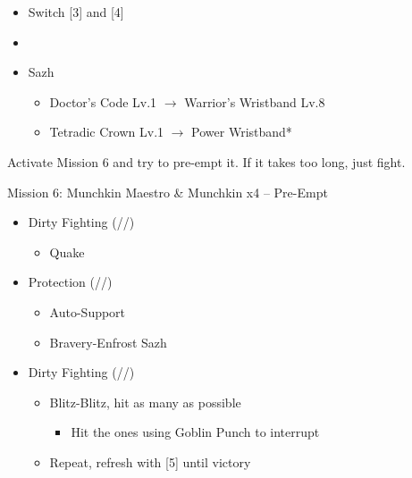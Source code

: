 \begin{menu}
	\begin{itemize}
		\paradigm
		\begin{itemize}
			\item Switch [3] and [4]
			\item {}%
				  {\paradigmline{(\syn)}{(\med)}{\sen}}%
			      {\paradigmline{\rav}{(\sab)}{\rav}}%
			      {\paradigmline{\syn}{\med}{\com}}%
			      {\paradigmline{(\syn)}{\sab}{\rav}}%
			      {\paradigmline{\com}{(\sab)}{\com}}%
			      {\paradigmline[4]{\com}{\sab}{\sen}}
		\end{itemize}
		\equip
		\begin{itemize}
			\item Sazh
				\begin{itemize}
					\item Doctor's Code Lv.1 $\rightarrow$ Warrior's Wristband Lv.8
					\item Tetradic Crown Lv.1 $\rightarrow$ Power Wristband*
				\end{itemize}
		\end{itemize}
	\end{itemize}
\end{menu}

\renewcommand{\first}{[1] Protection (\syn/\med/\sen)}
\renewcommand{\second}{[2] Smart Bomb (\rav/\sab/\rav}
\renewcommand{\third}{[3] Hero's Charge (\syn/\med/\com)}
\renewcommand{\fourth}{[4] Guerilla (\syn/\sab/\rav)}
\renewcommand{\fifth}{[5] Devastation (\com/\sab/\com)}
\renewcommand{\sixth}{[6] Dirty Fighting (\com/\sab/\sen)}

Activate Mission 6 and try to pre-empt it. If it takes too long, just fight.

\begin{battle}{Mission 6: Munchkin Maestro \& Munchkin x4 -- Pre-Empt}
	\begin{itemize}
		\item \sixth
			\begin{itemize}
				\item Quake
			\end{itemize}
		\item \first
			\begin{itemize}
				\item Auto-Support
				\item Bravery-Enfrost Sazh
			\end{itemize}
		\item \sixth
			\begin{itemize}
				\item Blitz-Blitz, hit as many as possible
					\begin{itemize}
						\item Hit the ones using Goblin Punch to interrupt
					\end{itemize}
				\item Repeat, refresh with [5] until victory
			\end{itemize}
	\end{itemize}
\end{battle}

